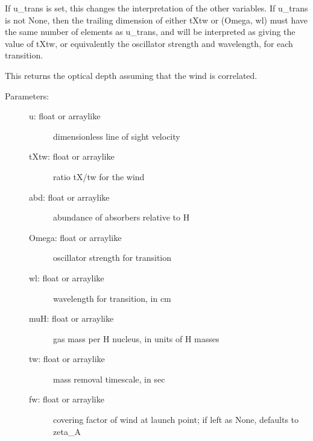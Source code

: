 \documentclass[letterpaper,10pt,english]{sphinxmanual}
\begin{document}
\begin{fulllineitems}
\begin{fulllineitems}
\begin{description}
If u\_trans is set, this changes the interpretation of the
other variables. If u\_trans is not None, then the trailing
dimension of either tXtw or (Omega, wl) must have the same
number of elements as u\_trans, and will be interpreted as
giving the value of tXtw, or equivalently the oscillator
strength and wavelength, for each transition.

\end{description}

\end{fulllineitems}


\begin{fulllineitems}
\label{fulldoc:despotic.winds.pwind.tau_c}
This returns the optical depth assuming that the wind is
correlated.
\begin{description}
\item[{Parameters:}] \leavevmode\begin{description}
\item[{u: float or arraylike}] \leavevmode
dimensionless line of sight velocity

\item[{tXtw: float or arraylike}] \leavevmode
ratio tX/tw for the wind

\item[{abd: float or arraylike}] \leavevmode
abundance of absorbers relative to H

\item[{Omega: float or arraylike}] \leavevmode
oscillator strength for transition

\item[{wl: float or arraylike}] \leavevmode
wavelength for transition, in cm

\item[{muH: float or arraylike}] \leavevmode
gas mass per H nucleus, in units of H masses

\item[{tw: float or arraylike}] \leavevmode
mass removal timescale, in sec

\item[{fw: float or arraylike}] \leavevmode
covering factor of wind at launch point; if left as
None, defaults to zeta\_A


\end{description}
\end{description}
\end{fulllineitems}
\end{fulllineitems}
\end{document}
